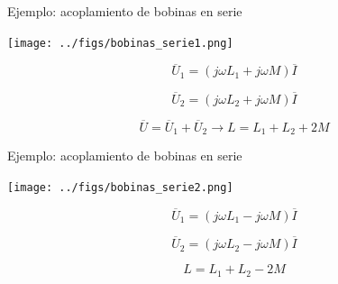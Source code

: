 \documentclass[xcolor={usenames,svgnames,dvipsnames}]{beamer}
\begin{document}
\begin{frame}[label={sec:org5ac560c}]{Ejemplo: acoplamiento de bobinas en serie}
\begin{center}
\texttt{[image: ../figs/bobinas\_serie1.png]}
\end{center}
\[
  \overline{U}_1 = (j \omega L_1 + j \omega M) \overline{I}
\]

\[
  \overline{U}_2 = (j \omega L_2 + j \omega M) \overline{I}
\]

\[
 \overline{U} = \overline{U}_1 + \overline{U}_2 \rightarrow \boxed{L = L_1 + L_2 + 2M}
\]
\end{frame}
\begin{frame}[label={sec:org0bda34d}]{Ejemplo: acoplamiento de bobinas en serie}
\begin{center}
\texttt{[image: ../figs/bobinas\_serie2.png]}
\end{center}
\[
  \overline{U}_1 = (j \omega L_1 - j \omega M) \overline{I}
\]

\[
  \overline{U}_2 = (j \omega L_2 - j \omega M) \overline{I}
\]

\[
 \boxed{L = L_1 + L_2 - 2M}
\]
\end{frame}
\end{document}
